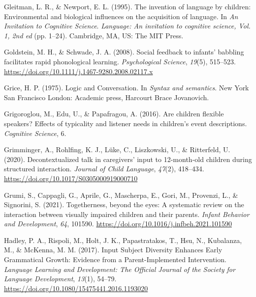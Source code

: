\documentclass[
  man,floatsintext]{apa6}
\newlength{\cslhangindent}
\newlength{\cslentryspacingunit} %
\newenvironment{CSLReferences}[2] %
 {%
  \setlength{\parindent}{0pt}
  \ifodd #1
  \let\oldpar\par
  \def\par{\hangindent=\cslhangindent\oldpar}
  \fi
  \setlength{\parskip}{#2\cslentryspacingunit}
 }%
 {}
\begin{document}
\begin{CSLReferences}{1}{0}
\leavevmode{}%
Gleitman, L. R., \& Newport, E. L. (1995). The invention of language by children: {Environmental} and biological influences on the acquisition of language. In \emph{An Invitation to Cognitive Science}. \emph{Language: {An} invitation to cognitive science, {Vol}. 1, 2nd ed} (pp. 1--24). Cambridge, MA, US: The MIT Press.

\leavevmode{}%
Goldstein, M. H., \& Schwade, J. A. (2008). Social feedback to infants' babbling facilitates rapid phonological learning. \emph{Psychological Science}, \emph{19}(5), 515--523. \url{https://doi.org/10.1111/j.1467-9280.2008.02117.x}

\leavevmode{}%
Grice, H. P. (1975). {Logic and Conversation}. In \emph{{Syntax and semantics}}. New York San Francisco London: Academic press, Harcourt Brace Jovanovich.

\leavevmode{}%
Grigoroglou, M., Edu, U., \& Papafragou, A. (2016). Are children flexible speakers? {Effects} of typicality and listener needs in children's event descriptions. \emph{Cognitive Science}, 6.

\leavevmode{}%
Grimminger, A., Rohlfing, K. J., Lüke, C., Liszkowski, U., \& Ritterfeld, U. (2020). Decontextualized talk in caregivers' input to 12-month-old children during structured interaction. \emph{Journal of Child Language}, \emph{47}(2), 418--434. \url{https://doi.org/10.1017/S0305000919000710}

\leavevmode{}%
Grumi, S., Cappagli, G., Aprile, G., Mascherpa, E., Gori, M., Provenzi, L., \& Signorini, S. (2021). Togetherness, beyond the eyes: {A} systematic review on the interaction between visually impaired children and their parents. \emph{Infant Behavior and Development}, \emph{64}, 101590. \url{https://doi.org/10.1016/j.infbeh.2021.101590}

\leavevmode{}%
Hadley, P. A., Rispoli, M., Holt, J. K., Papastratakos, T., Hsu, N., Kubalanza, M., \& McKenna, M. M. (2017). Input {Subject Diversity Enhances Early Grammatical Growth}: {Evidence} from a {Parent-Implemented Intervention}. \emph{Language Learning and Development: The Official Journal of the Society for Language Development}, \emph{13}(1), 54--79. \url{https://doi.org/10.1080/15475441.2016.1193020}


\end{CSLReferences}
\end{document}
